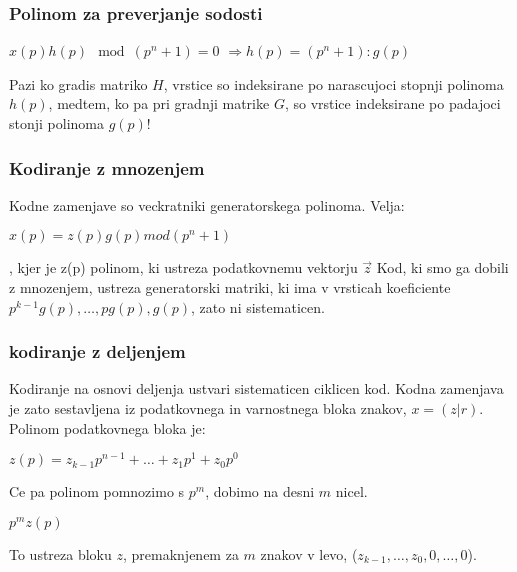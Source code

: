 \documentclass{article}
\begin{document}
\begin{multicols}{4}
	\subsubsection{Polinom za preverjanje sodosti}
	\begin{center}
		\begin{math}
			x(p)h(p) \mod(p^n + 1) = 0
		\end{math}
		\begin{math}
			\Rightarrow h(p) = (p^n + 1) : g(p)
		\end{math}
	\end{center}
	Pazi ko gradis matriko $H$, vrstice so indeksirane po narascujoci stopnji polinoma $h(p)$, medtem,
	ko pa pri gradnji matrike $G$, so vrstice indeksirane po padajoci stonji polinoma $g(p)$!


	\subsubsection{Kodiranje z mnozenjem}
	Kodne zamenjave so veckratniki generatorskega polinoma.
	Velja:
	\begin{center}
		\begin{math}
			x(p) = z(p) g(p) mod (p^n + 1)
		\end{math}
	\end{center}, kjer je z(p) polinom, ki ustreza podatkovnemu vektorju $\vec{z}$
	Kod, ki smo ga dobili z mnozenjem, ustreza generatorski matriki, ki ima v vrsticah
	koeficiente $p^{k-1}g(p), \dots, pg(p), g(p)$, zato ni sistematicen.

	\subsubsection{kodiranje z deljenjem}
	Kodiranje na osnovi deljenja ustvari sistematicen ciklicen kod. Kodna zamenjava je zato sestavljena iz podatkovnega in varnostnega bloka znakov, $x = (z | r)$.
	Polinom podatkovnega bloka je:
	\begin{center}
		\begin{math}
			z(p) = z_{k-1}p^{n-1} + \dots + z_1p^{1} + z_0p^0
		\end{math}
	\end{center}
	Ce pa polinom pomnozimo s $p^m$, dobimo na desni $m$ nicel.
	\begin{center}
		\begin{math}
			p^m z(p)
		\end{math}
	\end{center}
	To ustreza bloku $z$, premaknjenem za $m$ znakov v levo, ($z_{k-1}, \dots, z_0, 0, \dots, 0$).


\end{multicols}
\end{document}
